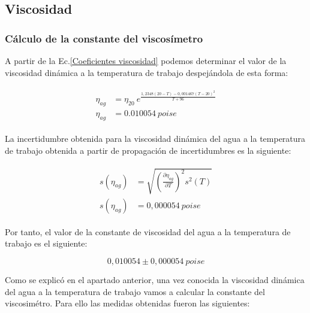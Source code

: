 \documentclass[a4paper,12pt,titlepage]{report}
\begin{document}
\subsection{Viscosidad}

\subsubsection{Cálculo de la constante del viscosímetro}

A partir de la Ec.\ref{Coeficientes viscosidad} podemos determinar el valor de la viscosidad dinámica a la temperatura de trabajo despejándola de esta forma:

\begin{align}
    \begin{split}   %
    \eta_{ag} &= \eta_{20}\: e^{\frac{1,2348(20-T)-0,001467(T-20)^2}{T+96}} \\
    \eta_{ag} &= 0.010054 \: poise
    \end{split}
\end{align}

La incertidumbre obtenida para la viscosidad dinámica del agua a la temperatura de trabajo obtenida a partir de propagación de incertidumbres es la siguiente:

\begin{align}
    \begin{split}
    s(\eta_{ag}) &= \sqrt{\left (\frac{\partial \eta_{ag}}{\partial T}\right )^2 s^2(T)} \\
    s(\eta_{ag}) &= 0,000054 \:poise
    \end{split}
\end{align}

Por tanto, el valor de la constante de viscosidad del agua a la temperatura de trabajo es el siguiente:

\begin{equation}
    0,010054 \pm 0,000054 \: poise
\end{equation}

Como se explicó en el apartado anterior, una vez conocida la viscosidad dinámica del agua a la temperatura de trabajo vamos a calcular la constante del viscosimétro. Para ello las medidas obtenidas fueron las siguientes:
\end{document}
